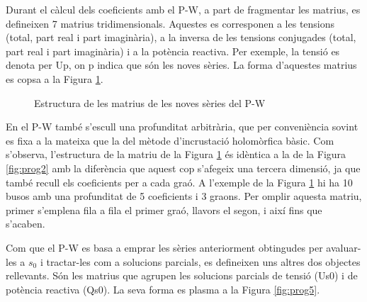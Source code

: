 Durant el càlcul dels coeficients amb el P-W, a part de fragmentar les matrius, es defineixen 7 matrius tridimensionals. Aquestes es corresponen a les tensions (total, part real i part imaginària), a la inversa de les tensions conjugades (total, part real i part imaginària) i a la potència reactiva. Per exemple, la tensió es denota per Up, on p indica que són les noves sèries. La forma d'aquestes matrius es copsa a la Figura \ref{fig:prog4}.

\begin{figure}[!htb] \footnotesize
    \begin{center}
  \caption{Estructura de les matrius de les noves sèries del P-W}
  \label{fig:prog4}
\end{center}
\end{figure}

En el P-W també s'escull una profunditat arbitrària, que per conveniència sovint es fixa a la mateixa que la del mètode d'incrustació holomòrfica bàsic. Com s'observa, l'estructura de la matriu de la Figura \ref{fig:prog4} és idèntica a la de la Figura \ref{fig:prog2} amb la diferència que aquest cop s'afegeix una tercera dimensió, ja que també recull els coeficients per a cada graó. A l'exemple de la Figura \ref{fig:prog4} hi ha 10 busos amb una profunditat de 5 coeficients i 3 graons. Per omplir aquesta matriu, primer s'emplena fila a fila el primer graó, llavors el segon, i així fins que s'acaben. 

Com que el P-W es basa a emprar les sèries anteriorment obtingudes per avaluar-les a $s_0$ i tractar-les com a solucions parcials, es defineixen uns altres dos objectes rellevants. Són les matrius que agrupen les solucions parcials de tensió (Us0) i de potència reactiva (Qs0). La seva forma es plasma a la Figura \ref{fig:prog5}.

